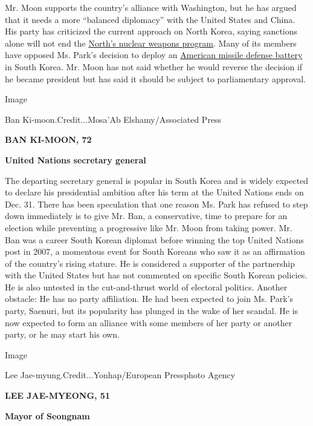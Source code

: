 Mr. Moon supports the country's alliance with Washington, but he has
argued that it needs a more ``balanced diplomacy'' with the United
States and China. His party has criticized the current approach on North
Korea, saying sanctions alone will not end the
\href{http://www.nytimes.com/topic/subject/north-koreas-nuclear-program}{North's
nuclear weapons program}. Many of its members have opposed Ms. Park's
decision to deploy an
\href{http://www.nytimes.com/2016/07/08/world/asia/south-korea-and-us-agree-to-deploy-missile-defense-system.html}{American
missile defense battery} in South Korea. Mr. Moon has not said whether
he would reverse the decision if he became president but has said it
should be subject to parliamentary approval.

Image

Ban Ki-moon.Credit...Mosa'Ab Elshamy/Associated Press

\textbf{BAN KI-MOON, 72}

\textbf{United Nations secretary general}

The departing secretary general is popular in South Korea and is widely
expected to declare his presidential ambition after his term at the
United Nations ends on Dec. 31. There has been speculation that one
reason Ms. Park has refused to step down immediately is to give Mr. Ban,
a conservative, time to prepare for an election while preventing a
progressive like Mr. Moon from taking power. Mr. Ban was a career South
Korean diplomat before winning the top United Nations post in 2007, a
momentous event for South Koreans who saw it as an affirmation of the
country's rising stature. He is considered a supporter of the
partnership with the United States but has not commented on specific
South Korean policies. He is also untested in the cut-and-thrust world
of electoral politics. Another obstacle: He has no party affiliation. He
had been expected to join Ms. Park's party, Saenuri, but its popularity
has plunged in the wake of her scandal. He is now expected to form an
alliance with some members of her party or another party, or he may
start his own.

Image

Lee Jae-myung.Credit...Yonhap/European Pressphoto Agency

\textbf{LEE JAE-MYEONG, 51}

\textbf{Mayor of Seongnam}

